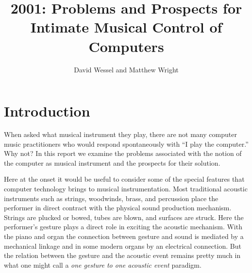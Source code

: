 
\graphicspath{ {mainmatter/Wessel_2001/} }

\title*{2001: Problems and Prospects for Intimate Musical Control of Computers}



\author{David Wessel and Matthew Wright}


%
%
\maketitle


\section{Introduction}

When asked what musical instrument they play, there are not many computer music practitioners who would respond spontaneously with ``I play the computer.'' Why not? In this report we examine the problems associated with the notion of the computer as musical instrument and the prospects for their solution.

Here at the onset it would be useful to consider some of the special features that computer technology brings to musical instrumentation. Most traditional acoustic instruments such as strings, woodwinds, brass, and percussion place the performer in direct contract with the physical sound production mechanism. Strings are plucked or bowed, tubes are blown, and surfaces are struck. Here the performer's gesture plays a direct role in exciting the acoustic mechanism. With the piano and organ the connection between gesture and sound is mediated by a mechanical linkage and in some modern organs by an electrical connection. But the relation between the gesture and the acoustic event remains pretty much in what one might call a \textit{one gesture to one acoustic event} paradigm.


